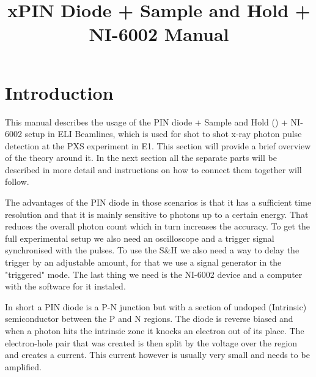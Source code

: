\documentclass[a4paper, 10pt]{article}
\title{xPIN Diode + Sample and Hold + NI-6002 Manual}
\begin{document}
\maketitle

\vspace*{15em}

\tableofcontents

\vspace{15em}

\section{Introduction}
This manual describes the usage of the PIN diode + Sample and Hold () + NI-6002 setup in ELI Beamlines, which is used for shot to shot x-ray photon pulse detection at the PXS experiment in E1.
This section will provide a brief overview of the theory around it.
In the next section all the separate parts will be described in more detail and instructions on how to connect them together will follow.

The advantages of the PIN diode in those scenarios is that it has a sufficient time resolution and that it is mainly sensitive to photons up to a certain energy.
That reduces the overall photon count which in turn increases the accuracy.
To get the full experimental setup we also need an oscilloscope and a trigger signal synchronised with the pulses.
To use the S\&H we also need a way to delay the trigger by an adjustable amount, for that we use a signal generator in the "triggered" mode.
The last thing we need is the NI-6002 device and a computer with the software for it instaled.


In short a PIN diode is a P-N junction but with a section of undoped (Intrinsic) semiconductor between the P and N regions.
The diode is reverse biased and when a photon hits the intrinsic zone it knocks an electron out of its place.
The electron-hole pair that was created is then split by the voltage over the region and creates a current.
This current however is usually very small and needs to be amplified.
\end{document}
